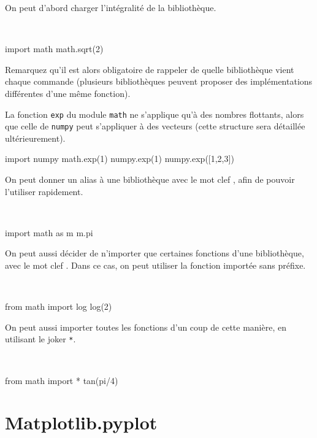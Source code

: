 On peut d'abord charger l'intégralité de la bibliothèque.
\begin{exemple}~
\begin{pyconsole}
import math
math.sqrt(2)
\end{pyconsole}
\end{exemple}
Remarquez qu'il est alors obligatoire de rappeler de quelle bibliothèque vient chaque commande (plusieurs bibliothèques peuvent proposer des implémentations différentes d'une même fonction).
\begin{exemple}
La fonction \texttt{exp} du module \texttt{math} ne s'applique qu'à des nombres flottants, alors que celle de \texttt{numpy} peut s'appliquer à des vecteurs (cette structure sera détaillée ultérieurement). 
\begin{pyconsole}
import numpy
math.exp(1)
numpy.exp(1)
numpy.exp([1,2,3])
\end{pyconsole}
\end{exemple}
On peut donner un alias à une bibliothèque avec le mot clef , afin de pouvoir l'utiliser rapidement. 
\begin{exemple}~
\begin{pyconsole}
import math as m
m.pi
\end{pyconsole}
\end{exemple}
On peut aussi décider de n'importer que certaines fonctions d'une bibliothèque, avec le mot clef . Dans ce cas, on peut utiliser la fonction importée sans préfixe. 
\begin{exemple}~
\begin{pyconsole}
from math import log
log(2)
\end{pyconsole}
\end{exemple}
On peut aussi importer toutes les fonctions d'un coup de cette manière, en utilisant le joker \texttt{*}.
\begin{exemple}~
\begin{pyconsole}
from math import *
tan(pi/4)
\end{pyconsole}
\end{exemple}

\section{Matplotlib.pyplot}

